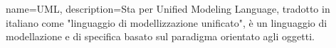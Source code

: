 {
	name={UML},
	description={Sta per Unified Modeling Language, tradotto in italiano come "linguaggio di modellizzazione unificato", è un linguaggio di modellazione e di specifica basato sul paradigma orientato agli oggetti. }
}